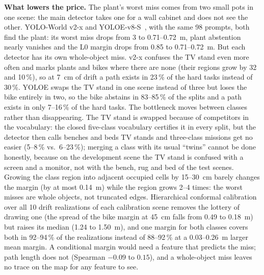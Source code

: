 \documentclass[conference]{IEEEtran}
\theoremstyle{definition}
\begin{document}
\textbf{What lowers the price.} The plant's worst miss comes from two small pots in one scene: the main detector
takes one for a wall cabinet and does not see the other. YOLO-World v2-x and YOLOE-v8-S~\cite{yoloe}, with the same 98
prompts, both find the plant: its worst miss drops from 3 to 0.71--0.72~m, plant abstention nearly vanishes and the
L0 margin drops from 0.85 to 0.71--0.72~m. But each detector has its own whole-object miss. v2-x confuses the TV stand
even more often and marks plants and bikes where there are none (their regions grow by 32 and 10\,\%), so at 7~cm of
drift a path exists in 23\,\% of the hard tasks instead of 30\,\%. YOLOE swaps the TV stand in one scene instead of
three but loses the bike entirely in two, so the bike abstains in 83--85\,\% of the splits and a path exists in only
7--16\,\% of the hard tasks. The bottleneck moves between classes rather than disappearing. The TV stand is swapped
because of competitors in the vocabulary: the closed five-class vocabulary certifies it in every split, but the
detector then calls benches and beds TV stands and three-class missions get no easier (5--8\,\% vs.\ 6--23\,\%);
merging a class with its usual ``twins'' cannot be done honestly, because on the development scene the TV stand is
confused with a screen and a monitor, not with the bench, rug and bed of the test scenes. Growing the class region into
adjacent occupied cells by 15--30~cm barely changes the margin (by at most 0.14~m) while the region grows 2--4 times:
the worst misses are whole objects, not truncated edges. Hierarchical conformal calibration~\cite{hcp} over all 10
drift realizations of each calibration scene removes the lottery of drawing one (the spread of the bike margin at
45~cm falls from 0.49 to 0.18~m) but raises its median (1.24 to 1.50~m), and one margin for both classes covers both
in 92--94\,\% of the realizations instead of 88--92\,\% at a 0.03--0.26~m larger mean margin. A conditional margin
would need a feature that predicts the miss; path length does not (Spearman $-0.09$ to $0.15$), and a whole-object
miss leaves no trace on the map for any feature to see.
\end{document}
